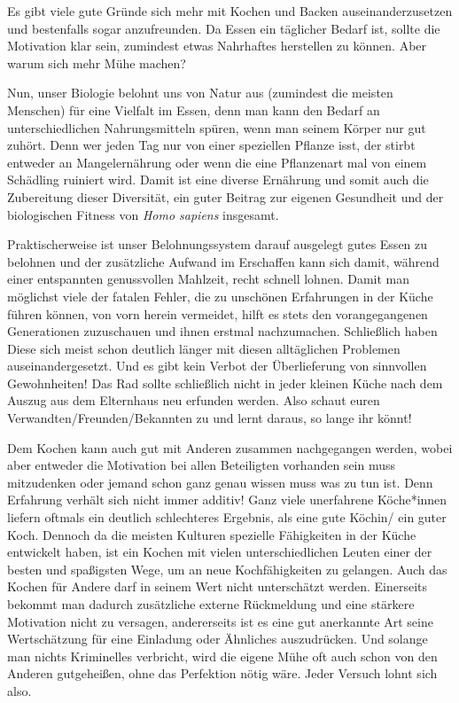 \documentclass[a4paper, 12pt]{scrbook} 								%
\numberwithin{equation}{section} 									%
\begin{document}
	Es gibt viele gute Gründe sich mehr mit Kochen und Backen auseinanderzusetzen und bestenfalls sogar anzufreunden. Da Essen ein täglicher Bedarf ist, sollte die Motivation klar sein, zumindest etwas Nahrhaftes herstellen zu können. 
	Aber warum sich mehr Mühe machen? 
	
	Nun, unser Biologie belohnt uns von Natur aus (zumindest die meisten Menschen) für eine Vielfalt im Essen, denn man kann den Bedarf an unterschiedlichen Nahrungsmitteln spüren, wenn man seinem Körper nur gut zuhört. Denn wer jeden Tag nur von einer speziellen Pflanze isst, der stirbt entweder an Mangelernährung oder wenn die eine Pflanzenart mal von einem Schädling ruiniert wird. Damit ist eine diverse Ernährung und somit auch die Zubereitung dieser Diversität, ein guter Beitrag zur eigenen Gesundheit und der biologischen Fitness von \emph{Homo sapiens} insgesamt.   

	Praktischerweise ist unser Belohnungssystem darauf ausgelegt gutes Essen zu belohnen und der zusätzliche Aufwand im Erschaffen kann sich damit, während einer entspannten genussvollen Mahlzeit, recht schnell lohnen. Damit man möglichst viele der fatalen Fehler, die zu unschönen Erfahrungen in der Küche führen können, von vorn herein vermeidet, hilft es stets den vorangegangenen Generationen zuzuschauen und ihnen erstmal nachzumachen. Schließlich haben Diese sich meist schon deutlich länger mit diesen alltäglichen Problemen auseinandergesetzt. Und es gibt kein Verbot der Überlieferung von sinnvollen Gewohnheiten! Das Rad sollte schließlich nicht in jeder kleinen Küche nach dem Auszug aus dem Elternhaus neu erfunden werden. Also schaut euren Verwandten/Freunden/Bekannten zu und lernt daraus, so lange ihr könnt! 
	
	Dem Kochen kann auch gut mit Anderen zusammen nachgegangen werden, wobei aber entweder die Motivation bei allen Beteiligten vorhanden sein muss mitzudenken oder jemand schon ganz genau wissen muss was zu tun ist. Denn Erfahrung verhält sich nicht immer additiv! Ganz viele unerfahrene Köche*innen liefern oftmals ein deutlich schlechteres Ergebnis, als eine gute Köchin/ ein guter Koch. Dennoch da die meisten Kulturen spezielle Fähigkeiten in der Küche entwickelt haben, ist ein Kochen mit vielen unterschiedlichen Leuten einer der besten und spaßigsten Wege, um an neue Kochfähigkeiten zu gelangen. Auch das Kochen für Andere darf in seinem Wert nicht unterschätzt werden. Einerseits bekommt man dadurch zusätzliche externe Rückmeldung und eine stärkere Motivation nicht zu versagen, andererseits ist es eine gut anerkannte Art seine Wertschätzung für eine Einladung oder Ähnliches auszudrücken. Und solange man nichts Kriminelles verbricht, wird die eigene Mühe oft auch schon von den Anderen gutgeheißen, ohne das Perfektion nötig wäre. Jeder Versuch lohnt sich also.
\end{document}
